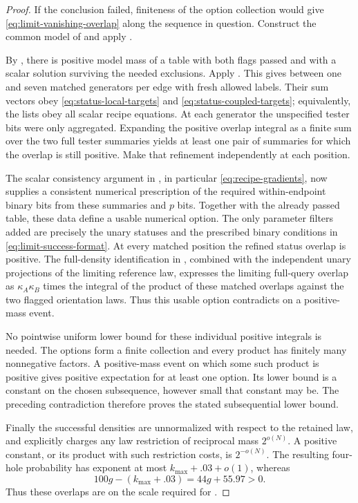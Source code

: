 \begin{proof}
If the conclusion failed, finiteness of the option collection would
give \eqref{eq:limit-vanishing-overlap} along the sequence in question.
Construct the common model of  and apply
.

By , there is positive model mass of a table with
both flags passed and with a scalar solution surviving the needed
exclusions. Apply . This gives between one and
seven matched generators per edge with fresh allowed labels. Their
sum vectors obey \eqref{eq:status-local-targets} and
\eqref{eq:status-coupled-targets}; equivalently, the lists obey all
scalar recipe equations. At each generator the unspecified tester
bits were only aggregated. Expanding the positive overlap integral
as a finite sum over the two full tester summaries yields at least
one pair of summaries for which the overlap is still positive.
Make that refinement independently at each position.

The scalar consistency argument in
, in particular \eqref{eq:recipe-gradients},
now supplies a consistent numerical prescription of the required
within-endpoint binary bits from these summaries and $p$ bits. Together
with the already passed table, these data define a usable numerical
option. The only parameter filters added are precisely the unary
statuses and the prescribed binary conditions in
\eqref{eq:limit-success-format}. At every matched position the refined
status overlap is positive. The full-density identification in
, combined with the independent unary
projections of the limiting reference law, expresses the limiting
full-query overlap as $\kappa_A\kappa_B$ times the integral of the product
of these matched overlaps against the two flagged orientation laws. Thus this
usable option contradicts  on a positive-mass
event.

No pointwise uniform lower bound for these individual positive
integrals is needed. The options form a finite collection and every
product has finitely many nonnegative factors. A positive-mass event
on which some such product is positive gives positive expectation
for at least one option. Its lower bound is a constant on the chosen
subsequence, however small that constant may be. The preceding
contradiction therefore proves the stated subsequential lower bound.

Finally the successful densities are unnormalized with respect to the
retained law, and  explicitly charges any law
restriction of reciprocal mass $2^{o(N)}$. A positive constant, or
its product with such restriction costs, is $2^{-o(N)}$. The resulting
four-hole probability has exponent at most
$k_{\max}+.03+o(1)$, whereas
\[
100g-(k_{\max}+.03)=44g+55.97>0.
\]
Thus these overlaps are on the scale required for
.
\end{proof}
